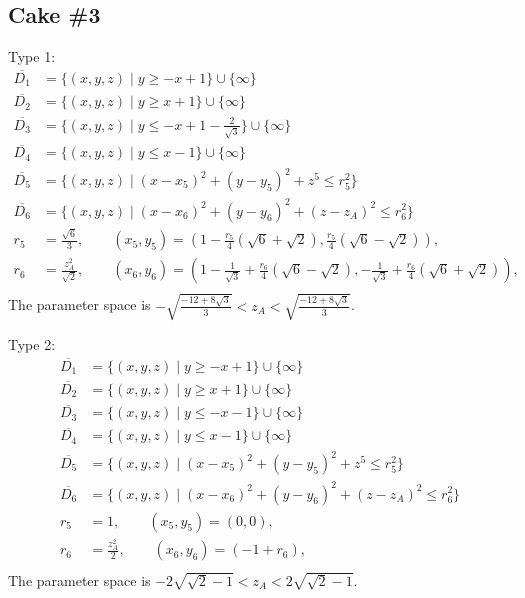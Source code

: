 \documentclass[suppldata, dvipdfmx]{interact}
\theoremstyle{plain}%
\theoremstyle{definition}
\theoremstyle{remark}
\theoremstyle{problemstyle}
\begin{document}
\subsection{Cake \#3}
Type 1:
\begin{align*}
\overline{D_1}&= \{ (x,y,z) \mid y \ge -x + 1 \} \cup \{ \infty \}\\
\overline{D_2}&= \{ (x,y,z) \mid y \ge x + 1 \} \cup \{ \infty \}\\
\overline{D_3}&= \{ (x,y,z) \mid y \le -x + 1 - \frac{2}{\sqrt{3}}  \} \cup \{ \infty \}\\
\overline{D_4}&= \{ (x,y,z) \mid y \le x -1 \} \cup \{ \infty \}\\
\overline{D_5}&=\{(x,y,z) \mid (x-x_5)^2+(y-y_5)^2+z^5 \le r_5^2 \} \\
\overline{D_6}&=\{(x,y,z) \mid (x-x_6)^2+(y-y_6)^2+(z-z_A)^2 \le r_6^2 \} \\
r_5 &= \frac{\sqrt{6}}{3}, \qquad
(x_5, y_5) = \left(1 - \frac{r_5}{4}(\sqrt{6} + \sqrt{2}), \frac{r_5}{4}(\sqrt{6} - \sqrt{2})\right), \\
r_6 &= \frac{z_A^2}{\sqrt{2}}, \qquad
(x_6, y_6) = \left(1 -\frac{1}{\sqrt{3}} + \frac{r_6}{4}(\sqrt{6} - \sqrt{2}), -\frac{1}{\sqrt{3}} + \frac{r_6}{4}(\sqrt{6} + \sqrt{2})\right), \\
\end{align*}
The parameter space is $-\sqrt{\frac{-12 + 8 \sqrt{3}}{3}} < z_A < \sqrt{\frac{-12 + 8 \sqrt{3}}{3}}$.
\bigskip\par
Type 2:
\begin{align*}
\overline{D_1}&= \{ (x,y,z) \mid y \ge -x + 1 \} \cup \{ \infty \}\\
\overline{D_2}&= \{ (x,y,z) \mid y \ge x + 1 \} \cup \{ \infty \}\\
\overline{D_3}&= \{ (x,y,z) \mid y \le -x -1 \} \cup \{ \infty \}\\
\overline{D_4}&= \{ (x,y,z) \mid y \le x - 1 \} \cup \{ \infty \}\\
\overline{D_5}&=\{(x,y,z) \mid (x-x_5)^2+(y-y_5)^2+z^5 \le r_5^2 \} \\
\overline{D_6}&=\{(x,y,z) \mid (x-x_6)^2+(y-y_6)^2+(z-z_A)^2 \le r_6^2 \} \\
r_5 &= 1, \qquad
(x_5, y_5) = \left(0, 0\right), \\
r_6 &= \frac{z_A^2}{2}, \qquad
(x_6, y_6) = \left(-1 + r_6\right), \\
\end{align*}
The parameter space is $-2\sqrt{\sqrt{2} - 1} < z_A < 2\sqrt{\sqrt{2} -1}$.
\end{document}
